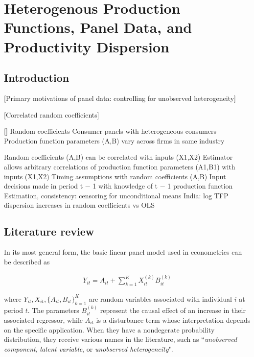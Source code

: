 \chapter{Heterogenous Production Functions, Panel Data, and Productivity Dispersion}

\doublespacing

\section{Introduction}

[Primary motivations of panel data: controlling for unobserved heterogeneity]

[Correlated random coefficients]

[]
Random coefficients
 Consumer panels with heterogeneous consumers
 Production function parameters (A,B) vary across firms in
same industry


Random coefficients (A,B) can be correlated with inputs (X1,X2)
  Estimator allows arbitrary correlations of production function parameters (A1,B1) with inputs (X1,X2)
  Timing assumptions with random coefficients (A,B)
  Input decisions made in period t − 1 with knowledge of t − 1
production function
  Estimation, consistency: censoring for unconditional means
  India: log TFP dispersion increases in random coefficients vs OLS

\section{Literature review}

In its most general form, the basic linear panel model used in econometrics can be described as

\begin{align}
  Y_{it} = A_{it} + \sum_{k=1}^{K} X_{it}^{(k)}B_{it}^{(k)}
\end{align}

\noindent where $Y_{it}, X_{it}, \{A_{it}, B_{it}\}_{k=1}^{K}$ are random variables associated with individual $i$ at period $t$. The parameters $B_{it}^{(k)}$ represent the causal effect of an increase in their associated regressor, while $A_{it}$ is a disturbance term whose interpretation depends on the specific application. When they have a nondegerate probability distribution, they receive various names in the literature, such as ``\emph{unobserved component}, \emph{latent variable}, or \emph{unobserved heterogeneity}"\citep[~p.251]{wooldridge2010econometric}.

